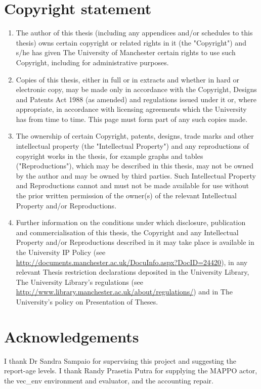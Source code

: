 \documentclass[12pt,a4paper]{article}
\begin{document}
\section*{Copyright statement}
\begin{enumerate}
\item[(i)] The author of this thesis (including any appendices and/or schedules to this thesis) owns certain copyright or related rights in it (the "Copyright") and s/he has given The University of Manchester certain rights to use such Copyright, including for administrative purposes.

\item[(ii)] Copies of this thesis, either in full or in extracts and whether in hard or electronic copy, may be made only in accordance with the Copyright, Designs and Patents Act 1988 (as amended) and regulations issued under it or, where appropriate, in accordance with licensing agreements which the University has from time to time. This page must form part of any such copies made.

\item[(iii)] The ownership of certain Copyright, patents, designs, trade marks and other intellectual property (the "Intellectual Property") and any reproductions of copyright works in the thesis, for example graphs and tables ("Reproductions"), which may be described in this thesis, may not be owned by the author and may be owned by third parties. Such Intellectual Property and Reproductions cannot and must not be made available for use without the prior written permission of the owner(s) of the relevant Intellectual Property and/or Reproductions.

\item[(iv)] Further information on the conditions under which disclosure, publication and commercialisation of this thesis, the Copyright and any Intellectual Property and/or Reproductions described in it may take place is available in the University IP Policy (see \url{http://documents.manchester.ac.uk/DocuInfo.aspx?DocID=24420}), in any relevant Thesis restriction declarations deposited in the University Library, The University Library's regulations (see \url{http://www.library.manchester.ac.uk/about/regulations/}) and in The University's policy on Presentation of Theses.

\end{enumerate}
\section*{Acknowledgements}
I thank Dr Sandra Sampaio for supervising this project and suggesting the report-age levels. I thank Randy Prasetia Putra for supplying the MAPPO actor, the vec\_env environment and evaluator, and the accounting repair.
\clearpage
\end{document}
